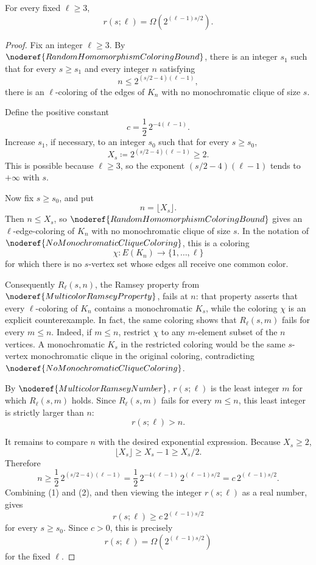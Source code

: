 \begin{theorem}
For every fixed \(\ell\ge 3\),
\[
  r(s;\ell)=\Omega(2^{(\ell-1)s/2}).
\]
\end{theorem}
\begin{proof}
Fix an integer \(\ell\ge3\). By \(\noderef{RandomHomomorphismColoringBound}\), there is an integer \(s_1\) such that for every \(s\ge s_1\) and every integer \(n\) satisfying
\[
  n\le 2^{(s/2-4)(\ell-1)},
\]
there is an \(\ell\)-coloring of the edges of \(K_n\) with no monochromatic clique of size \(s\).

Define the positive constant
\[
  c=\frac12\,2^{-4(\ell-1)}.
\]
Increase \(s_1\), if necessary, to an integer \(s_0\) such that for every \(s\ge s_0\),
\[
  X_s\coloneqq 2^{(s/2-4)(\ell-1)}\ge2.
\]
This is possible because \(\ell\ge3\), so the exponent \((s/2-4)(\ell-1)\) tends to \(+\infty\) with \(s\).

Now fix \(s\ge s_0\), and put
\[
  n=\lfloor X_s\rfloor.
\]
Then \(n\le X_s\), so \(\noderef{RandomHomomorphismColoringBound}\) gives an \(\ell\)-edge-coloring of \(K_n\) with no monochromatic clique of size \(s\). In the notation of \(\noderef{NoMonochromaticCliqueColoring}\), this is a coloring
\[
  \chi:E(K_n)\to\{1,\ldots,\ell\}
\]
for which there is no \(s\)-vertex set whose edges all receive one common color.

Consequently \(R_\ell(s,n)\), the Ramsey property from \(\noderef{MulticolorRamseyProperty}\), fails at \(n\): that property asserts that every \(\ell\)-coloring of \(K_n\) contains a monochromatic \(K_s\), while the coloring \(\chi\) is an explicit counterexample. In fact, the same coloring shows that \(R_\ell(s,m)\) fails for every \(m\le n\). Indeed, if \(m\le n\), restrict \(\chi\) to any \(m\)-element subset of the \(n\) vertices. A monochromatic \(K_s\) in the restricted coloring would be the same \(s\)-vertex monochromatic clique in the original coloring, contradicting \(\noderef{NoMonochromaticCliqueColoring}\).

By \(\noderef{MulticolorRamseyNumber}\), \(r(s;\ell)\) is the least integer \(m\) for which \(R_\ell(s,m)\) holds. Since \(R_\ell(s,m)\) fails for every \(m\le n\), this least integer is strictly larger than \(n\):
\[
  r(s;\ell)>n. \tag{1}
\]

It remains to compare \(n\) with the desired exponential expression. Because \(X_s\ge2\),
\[
  \lfloor X_s\rfloor\ge X_s-1\ge X_s/2.
\]
Therefore
\[
  n\ge \frac12\,2^{(s/2-4)(\ell-1)}
    =\frac12\,2^{-4(\ell-1)}\,2^{(\ell-1)s/2}
    =c\,2^{(\ell-1)s/2}. \tag{2}
\]
Combining (1) and (2), and then viewing the integer \(r(s;\ell)\) as a real number, gives
\[
  r(s;\ell)\ge c\,2^{(\ell-1)s/2}
\]
for every \(s\ge s_0\). Since \(c>0\), this is precisely
\[
  r(s;\ell)=\Omega(2^{(\ell-1)s/2})
\]
for the fixed \(\ell\).
\end{proof}
